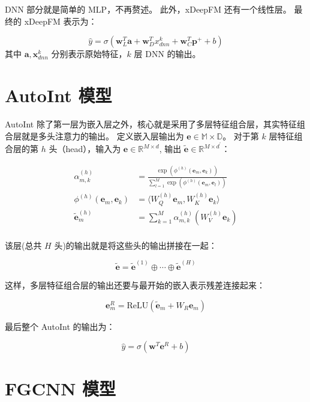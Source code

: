 \documentclass[degree=master,cjk-font=noto]{thuthesis}
\begin{document}
DNN 部分就是简单的 MLP，不再赘述。
此外，xDeepFM 还有一个线性层。
最终的 xDeepFM 表示为：

\begin{equation}
  \hat{y} = \sigma(\bm{w}_L^T \bm{a} + \bm{w}_D^T x^k_{dnn} + \bm{w}_C^T \bm{p}^+ + b)
\end{equation}
其中 $\bm{a}, \bm{x}^k_{dnn}$ 分别表示原始特征，$k$ 层 DNN 的输出。

\section{AutoInt 模型}
\label{sec:autoint}

AutoInt 除了第一层为嵌入层之外，核心就是采用了多层特征组合层，其实特征组合层就是多头注意力的输出。
定义嵌入层输出为 $\bm{e} \in \mathbb{M \times D}$。
对于第 $k$ 层特征组合层的第 $h$ 头（head），输入为 $\bm{e} \in \mathbb{R}^{M \times d}$, 输出 $\tilde{\bm{e}} \in \mathbb{R}^{M \times d^\prime}$：

\begin{align}
  \alpha_{m,k}^{(h)} &= \frac{\exp(\phi^{(h)}(\bm{e}_m, \bm{e}_k))}{\sum_{l=1}^M \exp(\phi^{(h)}(\bm{e}_m, \bm{e}_l))} \\
  \phi^{(h)}(\bm{e}_m, \bm{e}_k) &= \langle W_Q^{(h)} \bm{e}_m, W_K^{(h)} \bm{e}_k\rangle \\
  \tilde{\bm{e}}_m^{(h)} &= \sum_{k=1}^M \alpha_{m,k}^{(h)} (W_V^{(h)} \bm{e}_k) \\
\end{align}

该层(总共 $H$ 头)的输出就是将这些头的输出拼接在一起：

\begin{equation}
  \tilde{\bm{e}} = \tilde{\bm{e}}^{(1)} \oplus \cdots \oplus \tilde{\bm{e}}^{(H)}
\end{equation}

这样，多层特征组合层的输出还要与最开始的嵌入表示残差连接起来：

\begin{equation}
  \bm{e}^{R}_m = \text{ReLU}(\tilde{\bm{e}}_m + W_R \bm{e}_m)
\end{equation}

最后整个 AutoInt 的输出为：

\begin{equation}
  \hat{y} = \sigma(\bm{w}^T \bm{e}^R + b)
\end{equation}

\section{FGCNN 模型}
\label{sec:fgcnn}
\end{document}
